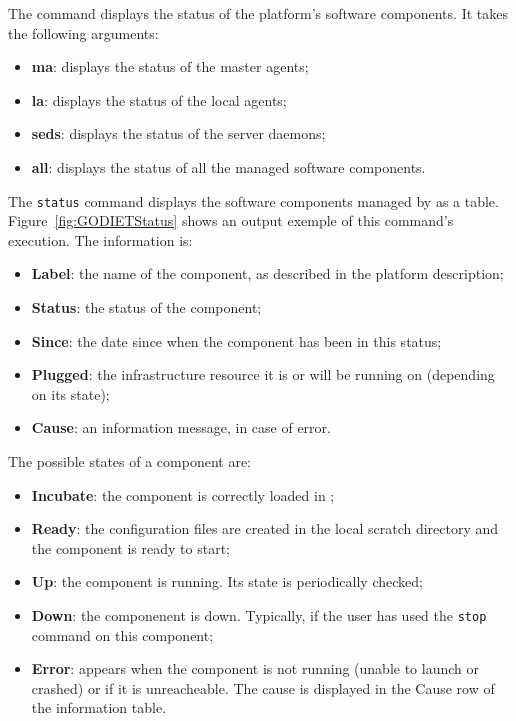The command displays the status of the \diet platform's software components. It takes the following arguments:
\begin{itemize}
\item \textbf{ma}: displays the status of the master agents;
\item \textbf{la}: displays the status of the local agents;
\item \textbf{seds}: displays the status of the server daemons;
\item \textbf{all}: displays the status of all the managed software components.
\end{itemize}
\vspace{1cm}

The \verb+status+ command displays the software components managed by \godiet as a table. Figure~\ref{fig:GODIETStatus} shows an output exemple of this command's execution.
The information is:
\begin{itemize}
\item \textbf{Label}: the name of the component, as described in the \diet platform description;
\item \textbf{Status}: the status of the component;
\item \textbf{Since}: the date since when the component has been in this status;
\item \textbf{Plugged}: the infrastructure resource it is or will be running on (depending on its state);
\item \textbf{Cause}: an information message, in case of error.
\end{itemize} 

\vspace{1cm}
The possible states of a component are:
\begin{itemize}
 \item \textbf{Incubate}: the component is correctly loaded in \godiet;
 \item \textbf{Ready}: the configuration files are created in the local scratch directory and the component is ready to start;
 \item \textbf{Up}: the component is running. Its state is periodically checked;
 \item \textbf{Down}: the componenent is down. Typically, if the \godiet user has used the \verb+stop+ command on this component;
 \item \textbf{Error}: appears when the component is not running (unable to launch or crashed) or if it is unreacheable. The cause is displayed in the Cause row of the information table.  
\end{itemize}

